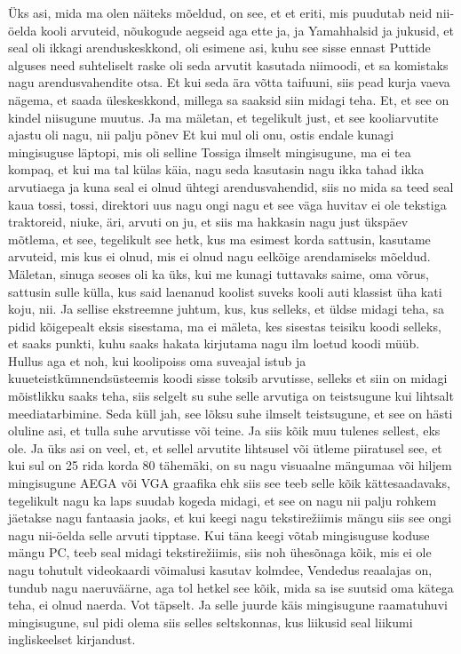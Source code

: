 Üks asi, mida ma olen näiteks mõeldud, on see, et et eriti, mis puudutab neid nii-öelda kooli arvuteid, nõukogude aegseid aga ette ja, ja Yamahhalsid ja jukusid, et seal oli ikkagi arenduskeskkond, oli esimene asi, kuhu see sisse ennast Puttide alguses need suhteliselt raske oli seda arvutit kasutada niimoodi, et sa komistaks nagu arendusvahendite otsa. Et kui seda ära võtta taifuuni, siis pead kurja vaeva nägema, et saada üleskeskkond, millega sa saaksid siin midagi teha. Et, et see on kindel niisugune muutus. Ja ma mäletan, et tegelikult just, et see kooliarvutite ajastu oli nagu, nii palju põnev
Et kui mul oli onu, ostis endale kunagi mingisuguse läptopi, mis oli selline Tossiga ilmselt mingisugune, ma ei tea kompaq, et kui ma tal külas käia, nagu seda kasutasin nagu ikka tahad ikka arvutiaega ja kuna seal ei olnud ühtegi arendusvahendid, siis no mida sa teed seal kaua tossi, tossi, direktori uus nagu ongi nagu et see väga huvitav ei ole tekstiga traktoreid, niuke, äri, arvuti on ju, et siis ma hakkasin nagu just ükspäev mõtlema, et see, tegelikult see hetk, kus ma esimest korda sattusin, kasutame arvuteid, mis kus ei olnud, mis ei olnud nagu eelkõige arendamiseks mõeldud. Mäletan, sinuga seoses oli ka üks, kui me kunagi tuttavaks saime, oma võrus, sattusin sulle külla, kus said laenanud koolist suveks kooli auti klassist üha kati koju, nii. Ja sellise ekstreemne juhtum, kus, kus selleks, et üldse midagi teha, sa pidid kõigepealt eksis sisestama, ma ei mäleta, kes sisestas teisiku koodi selleks, et saaks punkti, kuhu saaks hakata kirjutama nagu ilm loetud koodi müüb. Hullus aga et noh, kui koolipoiss oma suveajal istub ja kuueteistkümnendsüsteemis koodi sisse toksib arvutisse, selleks et siin on midagi mõistlikku saaks teha, siis selgelt su suhe selle arvutiga on teistsugune kui lihtsalt meediatarbimine. Seda küll jah, see lõksu suhe ilmselt teistsugune, et see on hästi oluline asi, et tulla suhe arvutisse või teine. Ja siis kõik muu tulenes sellest, eks ole. Ja üks asi on veel, et, et sellel arvutite lihtsusel või ütleme piiratusel see, et kui sul on 25 rida korda 80 tähemäki, on su nagu visuaalne mängumaa või hiljem mingisugune AEGA või VGA graafika ehk siis see teeb selle kõik kättesaadavaks, tegelikult nagu ka laps suudab kogeda midagi, et see on nagu nii palju rohkem jäetakse nagu fantaasia jaoks, et kui keegi nagu tekstirežiimis mängu siis see ongi nagu nii-öelda selle arvuti tipptase. Kui täna keegi võtab mingisuguse koduse mängu PC, teeb seal midagi tekstirežiimis, siis noh ühesõnaga kõik, mis ei ole nagu tohutult videokaardi võimalusi kasutav kolmdee, Vendedus reaalajas on, tundub nagu naeruväärne, aga tol hetkel see kõik, mida sa ise suutsid oma kätega teha, ei olnud naerda. Vot täpselt. Ja selle juurde käis mingisugune raamatuhuvi mingisugune, sul pidi olema siis selles seltskonnas, kus liikusid seal liikumi ingliskeelset kirjandust.
